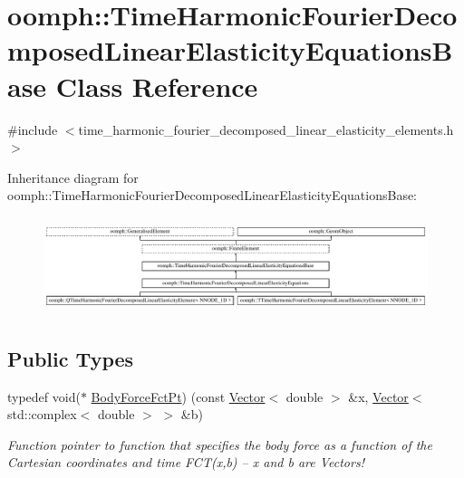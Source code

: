 \hypertarget{classoomph_1_1TimeHarmonicFourierDecomposedLinearElasticityEquationsBase}{}\section{oomph\+:\+:Time\+Harmonic\+Fourier\+Decomposed\+Linear\+Elasticity\+Equations\+Base Class Reference}
\label{classoomph_1_1TimeHarmonicFourierDecomposedLinearElasticityEquationsBase}


{\ttfamily \#include $<$time\+\_\+harmonic\+\_\+fourier\+\_\+decomposed\+\_\+linear\+\_\+elasticity\+\_\+elements.\+h$>$}

Inheritance diagram for oomph\+:\+:Time\+Harmonic\+Fourier\+Decomposed\+Linear\+Elasticity\+Equations\+Base\+:\begin{figure}[H]
\begin{center}
\leavevmode
\includegraphics[height=2.857143cm]{classoomph_1_1TimeHarmonicFourierDecomposedLinearElasticityEquationsBase}
\end{center}
\end{figure}
\subsection*{Public Types}
\begin{DoxyCompactItemize}
\item 
typedef void($\ast$ \hyperlink{classoomph_1_1TimeHarmonicFourierDecomposedLinearElasticityEquationsBase_ac582edc989cd98af8a03f5bf58d7a05a}{Body\+Force\+Fct\+Pt}) (const \hyperlink{classoomph_1_1Vector}{Vector}$<$ double $>$ \&x, \hyperlink{classoomph_1_1Vector}{Vector}$<$ std\+::complex$<$ double $>$ $>$ \&b)
\begin{DoxyCompactList}\small\item\em Function pointer to function that specifies the body force as a function of the Cartesian coordinates and time F\+C\+T(x,b) -- x and b are Vectors! \end{DoxyCompactList}\end{DoxyCompactItemize}
